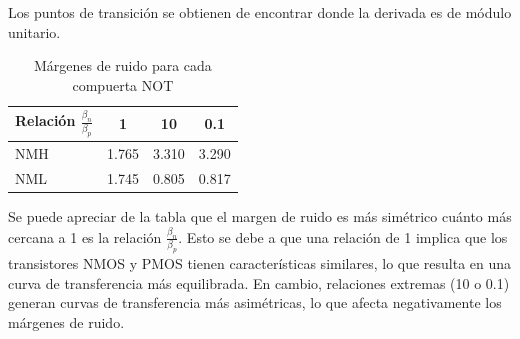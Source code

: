 Los puntos de transición se obtienen de encontrar donde la derivada es de módulo unitario.

\begin{table}[H]
    \centering
    \begin{tabular}{l|c|c|c} \hline
    Relación $\frac{\beta_n}{\beta_p}$ & 1 & 10 & 0.1 \\ \hline
    NMH & 1.765 & 3.310 & 3.290 \\ 
    NML & 1.745 & 0.805 & 0.817 \\ \hline
    \end{tabular}
    \caption{Márgenes de ruido para cada compuerta NOT}
    \label{tab:margenes_ruido}
\end{table}

Se puede apreciar de la tabla que el margen de ruido es más simétrico cuánto más cercana a 1 es la relación $\frac{\beta_n}{\beta_p}$. 
Esto se debe a que una relación de 1 implica que los transistores NMOS y PMOS tienen características similares, lo que resulta en una curva de transferencia más equilibrada. 
En cambio, relaciones extremas (10 o 0.1) generan curvas de transferencia más asimétricas, lo que afecta negativamente los márgenes de ruido.
